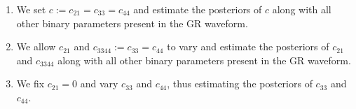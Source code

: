 \documentclass[prd,preprintnumbers,twocolumn,eqsecnum,floatfix,a4paper,nofootinbib,superscriptaddress]{revtex4}
\newcommand{\h}{\mathpzc{h}}
\newcommand{\hlm}{\mathpzc{h}_{\ell m}}
\newcommand{\Ylm}{{Y}^{-2}_{\ell m}}
\newcommand{\blambda}{\bm{\lambda}}
\newcommand{\btheta}{\bm{\theta}}
\begin{document}
\begin{enumerate}
\item We set $c := c_{21} = c_{33} = c_{44}$ and estimate the posteriors of $c$ along with all other binary parameters present in the GR waveform.  
\item We allow $c_{21}$ and $c_{3344} := c_{33} = c_{44} $ to vary and estimate the posteriors of $c_{21}$ and $c_{3344}$ along with all other binary parameters present in the GR waveform.  
\item We fix $c_{21} = 0$ and vary $c_{33}$ and $c_{44}$, thus estimating the posteriors of $c_{33}$ and $c_{44}$. 
\end{enumerate}

%  
%  
% 	
\end{document}
